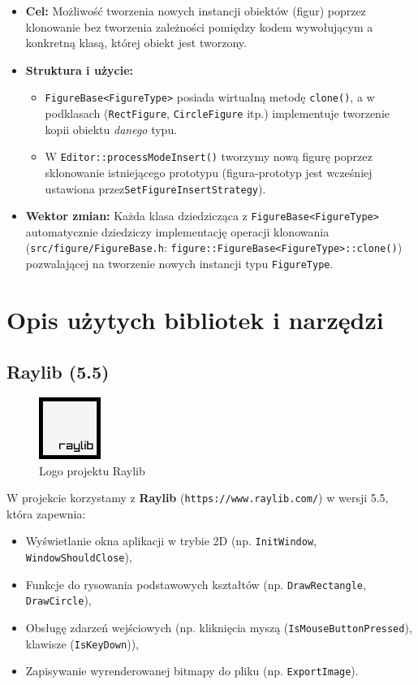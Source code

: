 \documentclass[a4paper,12pt]{article}
\begin{document}
\begin{itemize}
    \item \textbf{Cel:} Możliwość tworzenia nowych instancji obiektów (figur)
      poprzez klonowanie bez tworzenia zależności pomiędzy kodem wywołującym 
      a konkretną klasą, której obiekt jest tworzony.
    \item \textbf{Struktura i użycie:}
    \begin{itemize}
      \item \texttt{FigureBase<FigureType>} posiada wirtualną metodę \texttt{clone()},
      a w podklasach (\texttt{RectFigure}, \texttt{CircleFigure} itp.) implementuje 
      tworzenie kopii obiektu \emph{danego} typu.
      \item W \texttt{Editor::processModeInsert()} tworzymy nową figurę poprzez
      sklonowanie istniejącego prototypu (figura-prototyp jest wcześniej
      ustawiona przez\break \texttt{SetFigureInsertStrategy}).
    \end{itemize}
    \item \textbf{Wektor zmian:} Każda klasa dziedzicząca z \texttt{FigureBase<FigureType>}
      automatycznie dziedziczy implementację operacji klonowania (\verb|src/figure/FigureBase.h|: \verb|figure::FigureBase<FigureType>::clone()|) pozwalającej na tworzenie
    nowych instancji typu \texttt{FigureType}.
\end{itemize}

\section{Opis użytych bibliotek i narzędzi}

\subsection{Raylib (5.5)}

\begin{figure}[H]
\begin{center}
  \includegraphics[height=2cm]{figures/raylib_256x256.png} 
\end{center}
\caption{Logo projektu Raylib}
\end{figure}

W projekcie korzystamy z \textbf{Raylib} (\verb|https://www.raylib.com/|) w wersji 5.5, która zapewnia:
\begin{itemize}
    \item Wyświetlanie okna aplikacji w trybie 2D (np. \texttt{InitWindow}, \texttt{WindowShouldClose}),
    \item Funkcje do rysowania podstawowych kształtów (np. \texttt{DrawRectangle}, \texttt{DrawCircle}),
    \item Obsługę zdarzeń wejściowych (np. kliknięcia myszą (\texttt{IsMouseButtonPressed}), klawisze (\texttt{IsKeyDown})),
    \item Zapisywanie wyrenderowanej bitmapy do pliku (np. \texttt{ExportImage}).
\end{itemize}
\end{document}
